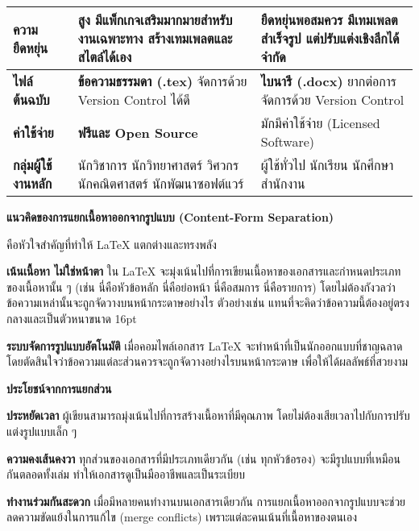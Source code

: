 \begin{table}[t]
\begin{tabularx}{\textwidth}{|l|L|L|}
        \hline
        \textbf{ความยืดหยุ่น} & \textbf{สูง} มีแพ็กเกจเสริมมากมายสำหรับงานเฉพาะทาง สร้างเทมเพลตและสไตล์ได้เอง & ยืดหยุ่นพอสมควร มีเทมเพลตสำเร็จรูป แต่ปรับแต่งเชิงลึกได้จำกัด \\
        \hline
        \textbf{ไฟล์ต้นฉบับ} & \textbf{ข้อความธรรมดา (.tex)} จัดการด้วย Version Control ได้ดี & \textbf{ไบนารี (.docx)} ยากต่อการจัดการด้วย Version Control \\
        \hline
        \textbf{ค่าใช้จ่าย} & \textbf{ฟรีและ Open Source} & มักมีค่าใช้จ่าย (Licensed Software) \\
        \hline
        \textbf{กลุ่มผู้ใช้งานหลัก} & นักวิชาการ นักวิทยาศาสตร์ วิศวกร นักคณิตศาสตร์ นักพัฒนาซอฟต์แวร์ & ผู้ใช้ทั่วไป นักเรียน นักศึกษา สำนักงาน \\
        \hline
    \end{tabularx}
\end{table}

\hspace*{1.5em} %
\textbf{แนวคิดของการแยกเนื้อหาออกจากรูปแบบ (Content-Form Separation)}

\hspace*{1.5em} %
คือหัวใจสำคัญที่ทำให้ LaTeX แตกต่างและทรงพลัง

\begin{mycustomenum2}
    \item \textbf{เน้นเนื้อหา ไม่ใช่หน้าตา} ใน LaTeX จะมุ่งเน้นไปที่การเขียนเนื้อหาของเอกสารและกำหนดประเภทของเนื้อหานั้น ๆ (เช่น นี่คือหัวข้อหลัก นี่คือย่อหน้า นี่คือสมการ นี่คือรายการ) โดยไม่ต้องกังวลว่าข้อความเหล่านั้นจะถูกจัดวางบนหน้ากระดาษอย่างไร ตัวอย่างเช่น แทนที่จะคิดว่าข้อความนี้ต้องอยู่ตรงกลางและเป็นตัวหนาขนาด 16pt
    \item \textbf{ระบบจัดการรูปแบบอัตโนมัติ} เมื่อคอมไพล์เอกสาร LaTeX จะทำหน้าที่เป็นนักออกแบบที่ชาญฉลาด โดยตัดสินใจว่าข้อความแต่ละส่วนควรจะถูกจัดวางอย่างไรบนหน้ากระดาษ เพื่อให้ได้ผลลัพธ์ที่สวยงาม 
    \item \textbf{ประโยชน์จากการแยกส่วน}
    \begin{mycustomenum2}
        \item \textbf{ประหยัดเวลา} ผู้เขียนสามารถมุ่งเน้นไปที่การสร้างเนื้อหาที่มีคุณภาพ โดยไม่ต้องเสียเวลาไปกับการปรับแต่งรูปแบบเล็ก ๆ
        \item \textbf{ความคงเส้นคงวา} ทุกส่วนของเอกสารที่มีประเภทเดียวกัน (เช่น ทุกหัวข้อรอง) จะมีรูปแบบที่เหมือนกันตลอดทั้งเล่ม ทำให้เอกสารดูเป็นมืออาชีพและเป็นระเบียบ
        \item \textbf{ทำงานร่วมกันสะดวก} เมื่อมีหลายคนทำงานบนเอกสารเดียวกัน การแยกเนื้อหาออกจากรูปแบบจะช่วยลดความขัดแย้งในการแก้ไข (merge conflicts) เพราะแต่ละคนเน้นที่เนื้อหาของตนเอง
    \end{mycustomenum2}
\end{mycustomenum2}

